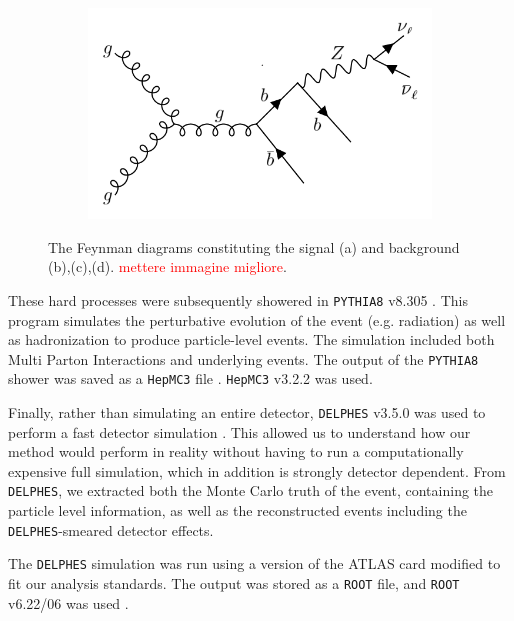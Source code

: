 \documentclass[10pt,a4paper]{book}
\newcommand\todo[1]{\textcolor{red}{#1}}
\def\code#1{\texttt{#1}}
\begin{document}
\begin{figure}
\begin{subfigure}{.5\textwidth}
\caption{}
\end{subfigure}
\begin{subfigure}{.5\textwidth}
\centering
\includegraphics[scale=0.15]{ch4_images/gbb3}
\caption{}
\end{subfigure}
\caption{The Feynman diagrams constituting the signal (a) and background (b),(c),(d). \todo{mettere immagine migliore}.}
\label{zhbb + gbb feynman diagrams}
\end{figure}

These hard processes were subsequently showered in \code{PYTHIA8} v8.305 \cite{Sjostrand:2014zea}. This program simulates the perturbative evolution of the event (e.g. radiation) as well as hadronization to produce particle-level events. The simulation included both Multi Parton Interactions and underlying events. The output of the \code{PYTHIA8} shower was saved as a \code{HepMC3} file \cite{BUCKLEY2021107310, Dobbs:2001ck}. \code{HepMC3} v3.2.2 was used.

Finally, rather than simulating an entire detector, \code{DELPHES} v3.5.0 was used to perform a fast detector simulation \cite{Ovyn:2009tx, deFavereau:2013fsa}. This allowed us to understand how our method would perform in reality without having to run a computationally expensive full simulation, which in addition is strongly detector dependent. From \code{DELPHES}, we extracted both the Monte Carlo truth of the event, containing the particle level information, as well as the reconstructed events including the \code{DELPHES}-smeared detector effects. 

The \code{DELPHES} simulation was run using a version of the ATLAS card modified to fit our analysis standards. The output was stored as a \code{ROOT} file, and \code{ROOT} v6.22/06 was used \cite{fons_rademakers_2020_3895852}. 
\end{document}
